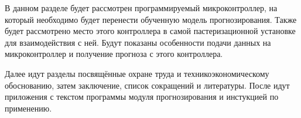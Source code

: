 {  \par {}

  \par \redline В данном разделе будет рассмотрен программируемый микроконтроллер, на который необходимо будет перенести обученную модель прогнозирования. Также будет рассмотрено место этого контроллера в самой пастеризационной установке для взаимодействия с ней. Будут показаны особенности подачи данных на микроконтроллер и получение прогноза с этого контроллера.  

  \par \redline Далее идут разделы посвящённые охране труда и техникоэкономическому обоснованию, затем заключение, список сокращений и литературы. После идут приложения с текстом программы модуля прогнозирования и инстукцией по применению. 

  \par
}